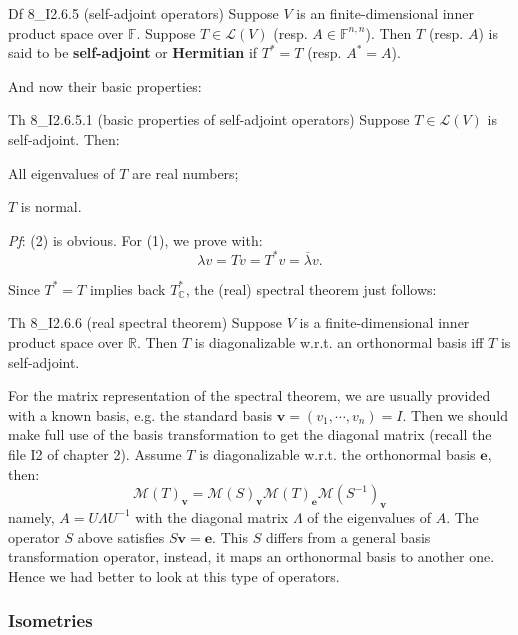 \documentclass{article}
\begin{document}
\begin{Df}{Df 8\_I2.6.5 (self-adjoint operators)}
    Suppose $V$ is an finite-dimensional inner product space over $\mathbb{F}$. Suppose $T\in\mathcal{L}(V)$ (resp. $A\in\mathbb{F}^{n,n}$). Then $T$ (resp. $A$) is said to be \textbf{self-adjoint} or \textbf{Hermitian} if $T^\ast = T$ (resp. $A^\ast = A$).
\end{Df}

And now their basic properties:

\begin{Th}{Th 8\_I2.6.5.1 (basic properties of self-adjoint operators)}
    Suppose $T\in\mathcal{L}(V)$ is self-adjoint. Then:
    \begin{compactenum}
        \item All eigenvalues of $T$ are real numbers;
        \item $T$ is normal.
    \end{compactenum}
    \tcblower
    \textit{Pf}: (2) is obvious. For (1), we prove with:
    $$ \lambda v = Tv = T^\ast v = \overline{\lambda} v. $$
\end{Th}

Since $T^\ast = T$ implies back $T^\ast_{\mathbb{C}}$, the (real) spectral theorem just follows:

\begin{Th}{Th 8\_I2.6.6 (real spectral theorem)}
    Suppose $V$ is a finite-dimensional inner product space over $\mathbb{R}$. Then $T$ is diagonalizable w.r.t. an orthonormal basis iff $T$ is self-adjoint.
\end{Th}

For the matrix representation of the spectral theorem, we are usually provided with a known basis, e.g. the standard basis $\pmb{v} = (v_1, \cdots, v_n) = I$. Then we should make full use of the basis transformation to get the diagonal matrix (recall the file I2 of chapter 2). Assume $T$ is diagonalizable w.r.t. the orthonormal basis $\pmb{e}$, then:
$$ \mathcal{M}(T)_{\pmb{v}} = \mathcal{M}(S)_{\pmb{v}}\mathcal{M}(T)_{\pmb{e}}\mathcal{M}(S^{-1})_{\pmb{v}} $$
namely, $A = U\Lambda U^{-1}$ with the diagonal matrix $\Lambda$ of the eigenvalues of $A$. The operator $S$ above satisfies $S\pmb{v} = \pmb{e}$. This $S$ differs from a general basis transformation operator, instead, it maps an orthonormal basis to another one. Hence we had better to look at this type of operators.

\subsubsection{Isometries}
\end{document}
